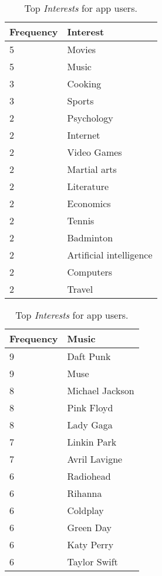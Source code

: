 \begin{table}[h]
\begin{minipage}[b]{.50\textwidth}
\centering
  \begin{tabular}{|l|l|} %
  \hline
  	\textbf{Frequency} & \textbf{Interest} \\ \hline
		5 & Movies \\ \hline
		5 & Music \\ \hline
		3 & Cooking \\ \hline
		3 & Sports \\ \hline
		2 & Psychology \\ \hline
		2 & Internet \\ \hline
		2 & Video Games \\ \hline
		2 & Martial arts \\ \hline
		2 & Literature \\ \hline
		2 & Economics \\ \hline
		2 & Tennis \\ \hline
		2 & Badminton \\ \hline
		2 & Artificial intelligence \\ \hline
		2 & Computers \\ \hline
		2 & Travel \\ \hline
  \end{tabular}
  \caption{Top \emph{Interests} for app users.}
\end{minipage}
\begin{minipage}[b]{.50\textwidth}
\centering
  \begin{tabular}{|l|l|} %
  \hline
  	\textbf{Frequency} & \textbf{Music} \\ \hline
		9 & Daft Punk \\ \hline
		9 & Muse \\ \hline
		8 & Michael Jackson \\ \hline
		8 & Pink Floyd \\ \hline
		8 & Lady Gaga \\ \hline
		7 & Linkin Park \\ \hline
		7 & Avril Lavigne \\ \hline
		6 & Radiohead \\ \hline
		6 & Rihanna \\ \hline
		6 & Coldplay \\ \hline
		6 & Green Day \\ \hline
		6 & Katy Perry \\ \hline
		6 & Taylor Swift \\ \hline

\end{tabular}
\end{minipage}
\end{table}
